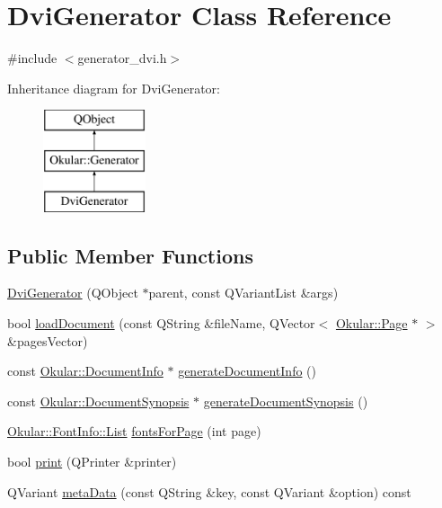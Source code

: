 \hypertarget{classDviGenerator}{\section{Dvi\+Generator Class Reference}
\label{classDviGenerator}
}


{\ttfamily \#include $<$generator\+\_\+dvi.\+h$>$}

Inheritance diagram for Dvi\+Generator\+:\begin{figure}[H]
\begin{center}
\leavevmode
\includegraphics[height=3.000000cm]{classDviGenerator}
\end{center}
\end{figure}
\subsection*{Public Member Functions}
\begin{DoxyCompactItemize}
\item 
\hyperlink{classDviGenerator_add18ac5457a98c23e3f35751f4b7da8c}{Dvi\+Generator} (Q\+Object $\ast$parent, const Q\+Variant\+List \&args)
\item 
bool \hyperlink{classDviGenerator_a4cb860362974bcb3dc4c4fd58c432366}{load\+Document} (const Q\+String \&file\+Name, Q\+Vector$<$ \hyperlink{classOkular_1_1Page}{Okular\+::\+Page} $\ast$ $>$ \&pages\+Vector)
\item 
const \hyperlink{classOkular_1_1DocumentInfo}{Okular\+::\+Document\+Info} $\ast$ \hyperlink{classDviGenerator_a85ae4d96c108cd28c3cc777d3074d8e5}{generate\+Document\+Info} ()
\item 
const \hyperlink{classOkular_1_1DocumentSynopsis}{Okular\+::\+Document\+Synopsis} $\ast$ \hyperlink{classDviGenerator_aeb5f2577ec948e19178e411179b5943c}{generate\+Document\+Synopsis} ()
\item 
\hyperlink{classOkular_1_1FontInfo_ada799641ba87703c808645f57fdfafaa}{Okular\+::\+Font\+Info\+::\+List} \hyperlink{classDviGenerator_a07abf71b072fecaaea489ae5073471d5}{fonts\+For\+Page} (int page)
\item 
bool \hyperlink{classDviGenerator_abb9db773a1e83c5fbfe0b75f3c7eeb05}{print} (Q\+Printer \&printer)
\item 
Q\+Variant \hyperlink{classDviGenerator_a78b4c37e9ae60c07d61ad0e934a93481}{meta\+Data} (const Q\+String \&key, const Q\+Variant \&option) const 
\end{DoxyCompactItemize}
